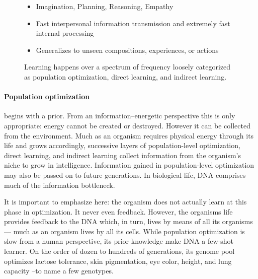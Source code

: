 \begin{figure}
{\begin{itemize}
    \item Imagination, Planning, Reasoning, Empathy
    \item Fast interpersonal information transmission and extremely fast internal processing
    \item Generalizes to unseen compositions, experiences, or actions
    \end{itemize}}
 \def\aiIndirectLearning{\begin{itemize}
    \item Unsupervised learning, in-context learning, zero/one/few-shot learning
    \item Would greatly reduce dataset demands
    \item This would realize the goal of transfer learning
    \end{itemize}}

 \centering
 
 \label{fig:2}
 \caption{Learning happens over a spectrum of frequency loosely categorized as population optimization, direct learning, and indirect learning. }
\end{figure}

\paragraph{Population optimization} begins with a prior. From an information–energetic perspective this is only appropriate: energy cannot be created or destroyed. However it can be collected from the environment. Much as an organism requires physical energy through its life and grows accordingly, successive layers of population-level optimization, direct learning, and indirect learning collect information from the organism’s niche to grow in intelligence. Information gained in population-level optimization may also be passed on to future generations. In biological life, DNA comprises much of the information bottleneck. 

It is important to emphasize here: the organism does not actually learn at this phase in optimization. It never even feedback. However, the organisms life provides feedback to the DNA which, in turn, lives by means of all its organisms — much as an organism lives by all its cells. While population optimization is slow from a human perspective, its prior knowledge make DNA a few-shot learner. On the order of dozen to hundreds of generations, its genome pool optimizes lactose tolerance, skin pigmentation, eye color, height, and lung capacity –to name a few genotypes. 

